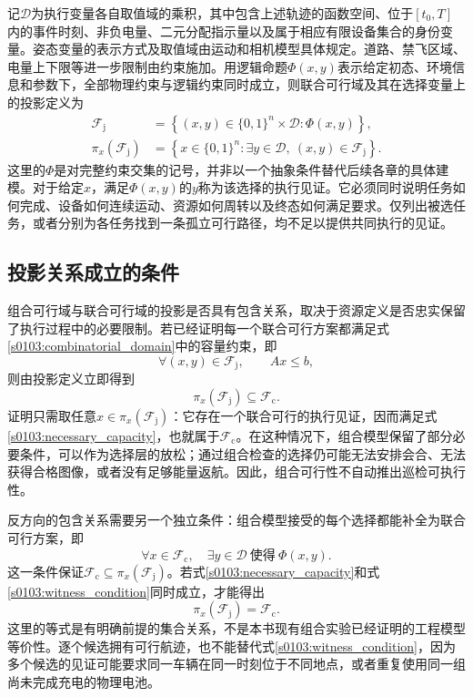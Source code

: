 记$\mathcal D$为执行变量各自取值域的乘积，其中包含上述轨迹的函数空间、位于$[t_0,T]$内的事件时刻、非负电量、二元分配指示量以及属于相应有限设备集合的身份变量。姿态变量的表示方式及取值域由运动和相机模型具体规定。道路、禁飞区域、电量上下限等进一步限制由约束施加。用逻辑命题$\Phi(x,y)$表示给定初态、环境信息和参数下，全部物理约束与逻辑约束同时成立，则联合可行域及其在选择变量上的投影定义为
\begin{align}
 \mathcal F_{\mathrm j}
 &=\left\{(x,y)\in\{0,1\}^{n}\times\mathcal D:
                \Phi(x,y)\right\},
 \label{s0103:joint_domain}\\
 \pi_x(\mathcal F_{\mathrm j})
 &=\left\{x\in\{0,1\}^{n}:\exists y\in\mathcal D,
                \ (x,y)\in\mathcal F_{\mathrm j}\right\}.
 \label{s0103:projection}
\end{align}
这里的$\Phi$是对完整约束交集的记号，并非以一个抽象条件替代后续各章的具体建模。对于给定$x$，满足$\Phi(x,y)$的$y$称为该选择的执行见证。它必须同时说明任务如何完成、设备如何连续运动、资源如何周转以及终态如何满足要求。仅列出被选任务，或者分别为各任务找到一条孤立可行路径，均不足以提供共同执行的见证。

\subsection{投影关系成立的条件}

组合可行域与联合可行域的投影是否具有包含关系，取决于资源定义是否忠实保留了执行过程中的必要限制。若已经证明每一个联合可行方案都满足式\eqref{s0103:combinatorial_domain}中的容量约束，即
\begin{equation}
 \forall (x,y)\in\mathcal F_{\mathrm j},\qquad Ax\leq b,
 \label{s0103:necessary_capacity}
\end{equation}
则由投影定义立即得到
\begin{equation}
 \pi_x(\mathcal F_{\mathrm j})\subseteq\mathcal F_{\mathrm c}.
 \label{s0103:outer_domain}
\end{equation}
证明只需取任意$x\in\pi_x(\mathcal F_{\mathrm j})$：它存在一个联合可行的执行见证，因而满足式\eqref{s0103:necessary_capacity}，也就属于$\mathcal F_{\mathrm c}$。在这种情况下，组合模型保留了部分必要条件，可以作为选择层的放松；通过组合检查的选择仍可能无法安排会合、无法获得合格图像，或者没有足够能量返航。因此，组合可行性不自动推出巡检可执行性。

反方向的包含关系需要另一个独立条件：组合模型接受的每个选择都能补全为联合可行方案，即
\begin{equation}
 \forall x\in\mathcal F_{\mathrm c},\quad
 \exists y\in\mathcal D\ \text{使得}\ \Phi(x,y).
 \label{s0103:witness_condition}
\end{equation}
这一条件保证$\mathcal F_{\mathrm c}\subseteq\pi_x(\mathcal F_{\mathrm j})$。若式\eqref{s0103:necessary_capacity}和式\eqref{s0103:witness_condition}同时成立，才能得出
\begin{equation}
 \pi_x(\mathcal F_{\mathrm j})=\mathcal F_{\mathrm c}.
 \label{s0103:conditional_equality}
\end{equation}
这里的等式是有明确前提的集合关系，不是本书现有组合实验已经证明的工程模型等价性。逐个候选拥有可行航迹，也不能替代式\eqref{s0103:witness_condition}，因为多个候选的见证可能要求同一车辆在同一时刻位于不同地点，或者重复使用同一组尚未完成充电的物理电池。

